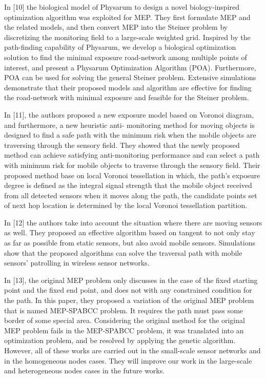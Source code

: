 \documentclass[final]{elsarticle}
\begin{document}
In [10] the biological model of Physarum to design a novel biology-inspired optimization algorithm was exploited for MEP. They first formulate MEP and the related models, and then convert MEP into the Steiner problem by discretizing the monitoring field to a large-scale weighted grid. Inspired by the path-finding capability of Physarum, we develop a biological optimization solution to find the minimal exposure road-network among multiple points of interest, and present a Physarum Optimization Algorithm (POA). Furthermore, POA can be used for solving the general Steiner problem. Extensive simulations demonstrate that their proposed models and algorithm are effective for finding the road-network with minimal exposure and feasible for the Steiner problem.

In [11], the authors proposed a new exposure model based on Voronoi diagram, and furthermore, a new heuristic anti- monitoring method for moving objects is designed to find a safe path with the minimum risk when the mobile objects are traversing through the sensory field. They showed that the newly proposed method can achieve satisfying anti-monitoring performance and can select a path with minimum risk for mobile objects to traverse through the sensory field. Their proposed method base on local Voronoi tessellation in which, the path’s exposure degree is defined as the integral signal strength that the mobile object received from all detected sensors when it moves along the path, the candidate points set of next hop location is determined by the local Voronoi tessellation partition.

In [12] the authors take into account the situation where there are moving sensors as well. They proposed an effective algorithm based on tangent to not only stay as far as possible from static sensors, but also avoid mobile sensors. Simulations show that the proposed algorithms can solve the traversal path with mobile sensors’ patrolling in wireless sensor networks.

In [13], the original MEP problem only discusses in the case of the fixed starting point and the fixed end point, and does not with any constrained condition for the path. In this paper, they proposed a variation of the original MEP problem that is named MEP-SPABCC problem. It requires the path must pass some border of some special area. Considering the original method for the original MEP problem fails in the MEP-SPABCC problem, it was translated into an optimization problem, and be resolved by applying the genetic algorithm. However, all of these works are carried out in the small-scale sensor networks and in the homogeneous nodes cases. They will improve our work in the large-scale and heterogeneous nodes cases in the future works.
\end{document}
